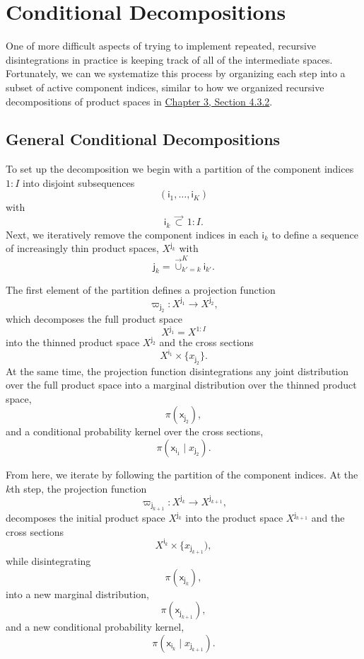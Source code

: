 \documentclass[
  letterpaper,
  DIV=11,
  numbers=noendperiod]{scrartcl}
\begin{document}
\section{Conditional Decompositions}\label{conditional-decompositions}

One of more difficult aspects of trying to implement repeated, recursive
disintegrations in practice is keeping track of all of the intermediate
spaces. Fortunately, we can we systematize this process by organizing
each step into a subset of active component indices, similar to how we
organized recursive decompositions of product spaces in
\href{http://www.symplectomorphic.com/assets/chapters_html/product_spaces.html\#general-case}{Chapter
3, Section 4.3.2}.

\subsection{General Conditional
Decompositions}\label{general-conditional-decompositions}

To set up the decomposition we begin with a partition of the component
indices \(1:I\) into disjoint subsequences \[
( \mathsf{i}_{1}, \ldots, \mathsf{i}_{K} )
\] with \[
\mathsf{i}_{k} \, \vec{\subset} \, 1:I.
\] Next, we iteratively remove the component indices in each
\(\mathsf{i}_{k}\) to define a sequence of increasingly thin product
spaces, \(X^{ \mathsf{j}_{k} }\) with \[
\mathsf{j}_{k}
=
\vec{\cup}_{k' = k}^{K} \mathsf{i}_{k'}.
\]

The first element of the partition defines a projection function \[
\varpi_{ \mathsf{j}_{2} } :
X^{ \mathsf{j}_{1} } \rightarrow X^{ \mathsf{j}_{2} },
\] which decomposes the full product space \[
X^{ \mathsf{j}_{1} } = X^{1:I}
\] into the thinned product space \(X^{ \mathsf{j}_{2} }\) and the cross
sections \[
X^{ \mathsf{i}_{1} } \times \{ x_{ \mathsf{j}_{2} } \}.
\] At the same time, the projection function disintegrations any joint
distribution over the full product space into a marginal distribution
over the thinned product space, \[
\pi( \mathsf{x}_{ \mathsf{j}_{2} } ),
\] and a conditional probability kernel over the cross sections, \[
\pi( \mathsf{x}_{ \mathsf{i}_{1} } \mid x_{ \mathsf{j}_{2} } ).
\]

From here, we iterate by following the partition of the component
indices. At the \(k\)th step, the projection function \[
\varpi_{ \mathsf{j}_{k + 1} } :
X^{ \mathsf{j}_{k} } \rightarrow X^{ \mathsf{j}_{k + 1} },
\] decomposes the initial product space \(X^{ \mathsf{j}_{k} }\) into
the product space \(X^{ \mathsf{j}_{k + 1} }\) and the cross sections \[
X^{ \mathsf{i}_{k} } \times \{ x_{ \mathsf{j}_{k + 1} }   ),
\] while disintegrating \[
\pi( \mathsf{x}_{ \mathsf{j}_{k} } ),
\] into a new marginal distribution, \[
\pi( \mathsf{x}_{ \mathsf{j}_{k + 1} } ),
\] and a new conditional probability kernel, \[
\pi( \mathsf{x}_{ \mathsf{i}_{k} } \mid x_{\mathsf{j}_{k + 1}} ).
\]
\end{document}
